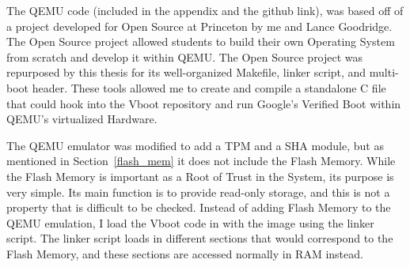 \documentclass[../report.tex]{subfiles}
\begin{document}
The QEMU code (included in the appendix and the github link), was based off of a project developed for Open Source at Princeton by me and Lance Goodridge.
The Open Source project allowed students to build their own Operating System from scratch and develop it within QEMU\@.
The Open Source project was repurposed by this thesis for its well-organized Makefile, linker script, and multi-boot header.
These tools allowed me to create and compile a standalone C file that could hook into the Vboot repository and run Google's Verified Boot within QEMU's virtualized Hardware.

The QEMU emulator was modified to add a TPM and a SHA module, but as mentioned in Section~\ref{flash_mem} it does not include the Flash Memory.
While the Flash Memory is important as a Root of Trust in the System, its purpose is very simple.
Its main function is to provide read-only storage, and this is not a property that is difficult to be checked.
Instead of adding Flash Memory to the QEMU emulation, I load the Vboot code in with the image using the linker script. %
The linker script loads in different sections that would correspond to the Flash Memory, and these sections are accessed normally in RAM instead.


\end{document}
